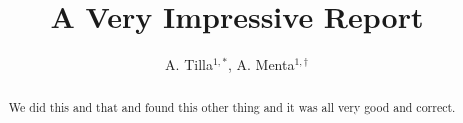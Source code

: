 \documentclass{anotherarticlestyle}
\title{A Very Impressive Report}
\author{A. Tilla$^{1,*}$, A. Menta$^{1, \dagger}$}
\begin{document}
\maketitle

\begin{strip}
    \begin{abstract}
        {\small We did this and that and found this other thing and it was all very good and correct.}
    \end{abstract}
\end{strip}

\end{document}
